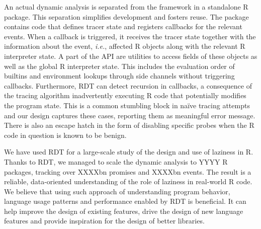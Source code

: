 \documentclass[acmsmall,review]{acmart}
\newcommand{\Ie}{\emph{i.e.}\xspace}
\newcommand{\RDT}{RDT\xspace}
\begin{document}
\bigskip
\indent An actual dynamic analysis is separated from the framework in a
standalone R package. This separation simplifies development and fosters reuse.
The package contains code that defines tracer state and registers callbacks for
the relevant events. When a callback is triggered, it receives the tracer state
together with the information about the event, \Ie, affected R objects along
with the relevant R interpreter state. A part of the API are utilities to
access fields of these objects as well as the global R interpreter state. This
includes the evaluation order of builtins and environment lookups through side
channels without triggering callbacks. Furthermore, \RDT can detect recursion
in callbacks, a consequence of the tracing algorithm inadvertently executing R
code that potentially modifies the program state. This is a common stumbling
block in na\"ive tracing attempts and our design captures these cases, reporting
them as meaningful error message. There is also an escape hatch in the form of
disabling specific probes when the R code in question is known to be benign.

We have used RDT for a large-scale study of the design and use of laziness in
R. Thanks to RDT, we managed to scale the dynamic analysis to YYYY R packages,
tracking over XXXXbn promises and XXXXbn events. The result is a reliable,
data-oriented understanding of the role of laziness in real-world R code.
%
We believe that using such approach of understanding program behavior, language
usage patterns and performance enabled by RDT is beneficial. It can help
improve the design of existing features, drive the design of new language
features and provide inspiration for the design of better libraries.
\end{document}
